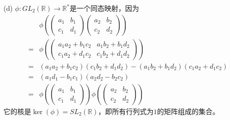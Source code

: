 \documentclass[a4paper, justified]{tufte-handout}
\begin{document}
\begin{solution}
	(d) $\phi: G L_2(\mathbb{R}) \rightarrow \mathbb{R}^*$是一个同态映射，因为
	$$
		\begin{aligned}                                                                                                           &
                                                                                                                        \phi\left(\left(\begin{array}{ll} a_{1} & b_{1} \\
             c_{1}      & d_{1}
				                                                                                                                                        \end{array}\right)
                                                                                                                        \left(\begin{array}{ll} a_{2} & b_{2} \\
             c_{2}      & d_{2}\end{array}\right)\right)                                                   \\
                                                                                                                        = & \phi\left(\left(\begin{array}{ll} a_{1} a_{2}+b_{1} c_{2} & a_{1} b_{2}+b_{1} d_{2} \\
             c_{1} a_{2}+d_{1} c_{2}      & c_{1} b_{2}+d_{1} d_{2}\end{array}\right)\right) \\
                                                                                                                        = & (a_{1} a_{2}+b_{1} c_{2})(c_{1} b_{2}+d_{1} d_{2})-(a_{1} b_{2}+b_{1} d_{2})(c_{1} a_{2}+d_{1} c_{2})                                                                                                                   \\
                                                                                                                        = & (a_1d_1-b_1c_1)(a_2d_2-b_2c_2)                                                                                                                                                                                          \\
                                                                                                                        = & \phi\left(\left(\begin{array}{ll} a_{1} & b_{1} \\
             c_{1}      & d_{1}\end{array}\right)\right)
                                                                                                                        \phi\left(\left(\begin{array}{ll} a_{2} & b_{2} \\
             c_{2}      & d_{2}\end{array}\right)\right)
		\end{aligned} $$
	它的核是$\ker(\phi) = SL_2(\mathbb{R})$，即所有行列式为$1$的矩阵组成的集合。


\end{solution}
\end{document}

